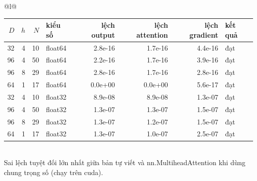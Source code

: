\begin{tabular}{@{}l@{}}
\begin{tabular}{rrrlrrrl}
\toprule
$D$ & $h$ & $N$ & kiểu số & lệch output & lệch attention & lệch gradient & kết quả \\
\midrule
32 & 4 & 10 & float64 & 2.8e-16 & 1.7e-16 & 4.4e-16 & đạt \\
96 & 4 & 50 & float64 & 2.2e-16 & 1.7e-16 & 3.9e-16 & đạt \\
96 & 8 & 29 & float64 & 2.8e-16 & 1.7e-16 & 2.8e-16 & đạt \\
64 & 1 & 17 & float64 & 0.0e+00 & 0.0e+00 & 5.6e-17 & đạt \\
32 & 4 & 10 & float32 & 8.9e-08 & 8.9e-08 & 1.3e-07 & đạt \\
96 & 4 & 50 & float32 & 1.3e-07 & 1.3e-07 & 1.5e-07 & đạt \\
96 & 8 & 29 & float32 & 1.3e-07 & 1.2e-07 & 1.5e-07 & đạt \\
64 & 1 & 17 & float32 & 1.3e-07 & 1.0e-07 & 2.5e-07 & đạt \\
\bottomrule
\end{tabular}
\\[2pt]
{\footnotesize Sai lệch tuyệt đối lớn nhất giữa bản tự viết và nn.MultiheadAttention khi dùng chung trọng số (chạy trên cuda).}
\end{tabular}
